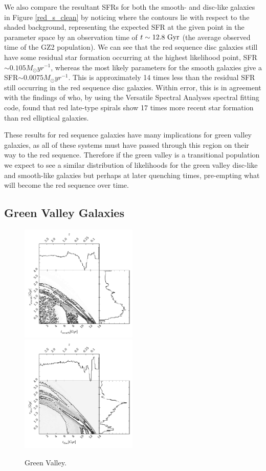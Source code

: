 \documentclass[useAMS,usenatbib]{mn2e}
\begin{document}
We also compare the resultant SFRs for both the smooth- and disc-like galaxies in Figure \ref{red_s_clean} by noticing where the contours lie with respect to the shaded background, representing the expected SFR at the given point in the parameter space by an observation time of $t\sim12.8~\rm{Gyr}$ (the average observed time of the GZ2 population). We can see that the red sequence disc galaxies still have some residual star formation occurring at the highest likelihood point, SFR$\sim0.105 M_{\odot}yr^{-1}$, whereas the most likely parameters for the smooth galaxies give a SFR$\sim0.0075 M_{\odot}yr^{-1}$. This is approximately 14 times less than the residual SFR still occurring in the red sequence disc galaxies. Within error, this is in agreement with the findings of \citet{Toj13} who, by using the Versatile Spectral Analyses spectral fitting code, found that red late-type spirals show 17 times more recent star formation than red elliptical galaxies.

These results for red sequence galaxies have many implications for green valley galaxies, as all of these systems must have passed through this region on their way to the red sequence. Therefore if the green valley is a transitional population we expect to see a similar distribution of likelihoods for the green valley disc-like and smooth-like galaxies but perhaps at later quenching times, pre-empting what will become the red sequence over time. 

\subsection{Green Valley Galaxies}\label{gv}

\begin{figure}
\includegraphics[width=0.4975\textwidth]{green_smooth.pdf}
\includegraphics[width=0.4975\textwidth]{green_disc.pdf}
\caption[8pt]{Green Valley.}
\label{gv}
\end{figure}
\end{document}
